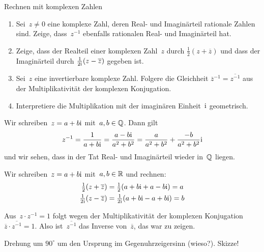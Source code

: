 \documentclass{algblatt}
\begin{document}
\ifloesungen\newpage\fi
\begin{aufgabe}{Rechnen mit komplexen Zahlen}
\begin{enumerate}
\item
Sei~$z \neq 0$ eine komplexe Zahl, deren Real- und Imaginärteil rationale
Zahlen sind. Zeige, dass~$z^{-1}$ ebenfalls rationalen Real- und Imaginärteil
hat.
\item
Zeige, dass der Realteil einer komplexen Zahl~$z$ durch $\frac{1}{2} (z + \overline z)$
und dass der Imaginärteil durch $\frac{1}{2 \mathrm{i}} (z - \overline z)$ gegeben ist.
\item
Sei~$z$ eine invertierbare komplexe Zahl. Folgere die Gleichheit
$\overline{z}^{-1} = \overline{z^{-1}}$
aus der Multiplikativität der komplexen Konjugation.
\item
Interpretiere die Multiplikation mit der imaginären Einheit~$\mathrm{i}$
geometrisch.
\end{enumerate}
\begin{loesungE}
\item Wir schreiben~$z = a + b \mathrm{i}$ mit~$a,b \in \mathbb{Q}$. Dann gilt
\[ z^{-1} = \frac{1}{a + b \mathrm{i}} = \frac{a - b \mathrm{i}}{a^2 + b^2} =
  \frac{a}{a^2 + b^2} + \frac{-b}{a^2 + b^2} \mathrm{i} \]
und wir sehen, dass in der Tat Real- und Imaginärteil wieder in~$\mathbb{Q}$ liegen.
\item Wir schreiben~$z = a + b \mathrm{i}$ mit~$a,b \in \mathbb{R}$ und rechnen:
\begin{align*}
  \tfrac{1}{2} (z + \overline z) &= \tfrac{1}{2} (a + b \mathrm{i} + a - b \mathrm{i}) = a \\
  \tfrac{1}{2\mathrm{i}} (z - \overline z) &= \tfrac{1}{2\mathrm{i}} (a + b \mathrm{i} - a + b \mathrm{i}) = b
\end{align*}
\item Aus~$z \cdot z^{-1} = 1$ folgt wegen der Multiplikativität der komplexen
Konjugation $\overline z \cdot \overline{z^{-1}} = 1$. Also
ist~$\overline{z^{-1}}$ das Inverse von~$\overline{z}$, das war zu zeigen.
\item Drehung um $90^\circ$ um den Ursprung im Gegenuhrzeigersinn (wieso?). Skizze!
\end{loesungE}
\end{aufgabe}
\end{document}
